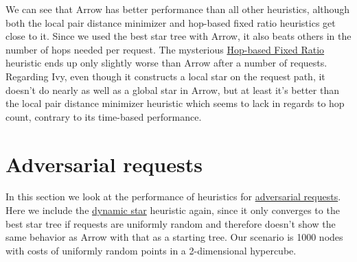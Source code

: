 \documentclass[a4paper, oneside]{discothesis}
\begin{document}

We can see that Arrow has better performance than all other heuristics, although both the local pair distance minimizer and hop-based fixed ratio heuristics get close to it. Since we used the best star tree with Arrow, it also beats others in the number of hops needed per request. The mysterious \hyperref[alg:frh]{Hop-based Fixed Ratio} heuristic ends up only slightly worse than Arrow after a number of requests. Regarding Ivy, even though it constructs a local star on the request path, it doesn't do nearly as well as a global star in Arrow, but at least it's better than the local pair distance minimizer heuristic which seems to lack in regards to hop count, contrary to its time-based performance.

\section{Adversarial requests}\label{result:adversary}

In this section we look at the performance of heuristics for \hyperref[req:adversary]{adversarial requests}. Here we include the \hyperref[alg:dynstar]{dynamic star} heuristic again, since it only converges to the best star tree if requests are uniformly random and therefore doesn't show the same behavior as Arrow with that as a starting tree. Our scenario is 1000 nodes with costs of uniformly random points in a 2-dimensional hypercube.
\end{document}
